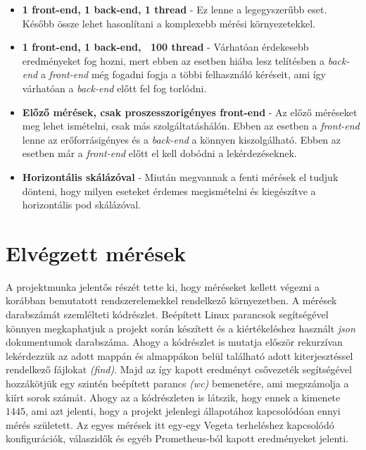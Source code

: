 \begin{itemize}
\item \textbf{1 front-end, 1 back-end, 1 thread} - Ez lenne a legegyszerűbb eset. Később össze lehet hasonlítani a komplexebb mérési környezetekkel.
\item \textbf{1 front-end, 1 back-end, ~100 thread} - Várhatóan érdekesebb eredményeket fog hozni, mert ebben az esetben hiába lesz telítésben a \textit{back-end} a \textit{front-end} még fogadni fogja a többi felhasználó kéréseit, ami így várhatóan a \textit{back-end} előtt fel fog torlódni.
\item \textbf{Előző mérések, csak proszesszorigényes front-end} - Az előző méréseket meg lehet ismételni, csak más szolgáltatáshálón. Ebben az esetben a \textit{front-end} lenne az erőforrásigényes és a \textit{back-end} a könnyen kiszolgálható. Ebben az esetben már a \textit{front-end} előtt el kell dobódni a lekérdezéseknek.
\item \textbf{Horizontális skálázóval} - Miután megvannak a fenti mérések el tudjuk dönteni, hogy milyen eseteket érdemes megismételni és kiegészítve a horizontális pod skálázóval.
\end{itemize}

\section{Elvégzett mérések}
A projektmunka jelentős részét tette ki, hogy méréseket kellett végezni a korábban bemutatott rendszerelemekkel rendelkező környezetben.
A mérések darabszámát szemlélteti  kódrészlet. Beépített Linux parancsok segítségével könnyen megkaphatjuk a projekt során készített és a kiértékeléshez használt \textit{json} dokumentumok darabszáma. Ahogy a kódrészlet is mutatja először rekurzívan lekérdezzük az adott mappán és almappákon belül található adott kiterjesztéssel rendelkező fájlokat \textit{(find)}. 
Majd az így kapott eredményt csővezeték segítségével hozzákötjük egy szintén beépített parancs \textit{(wc)} bemenetére, ami megszámolja a kiírt sorok számát. 
Ahogy az a kódrészleten is látszik, hogy ennek a kimenete $1445$, ami azt jelenti, hogy a projekt jelenlegi állapotához kapcsolódóan ennyi mérés született. %
Az egyes mérések itt egy-egy Vegeta terheléshez kapcsolódó konfigurációk, válaszidők és egyéb Prometheus-ból kapott eredményeket jelenti.

